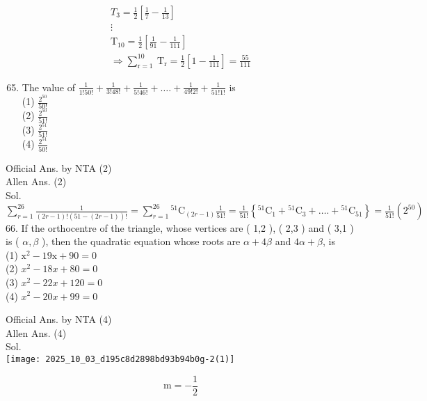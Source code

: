 \documentclass[10pt]{article}
\begin{document}
\[
\begin{gathered}
T_{3}=\frac{1}{2}\left[\frac{1}{7}-\frac{1}{13}\right] \\
\vdots \\
\mathrm{T}_{10}=\frac{1}{2}\left[\frac{1}{91}-\frac{1}{111}\right] \\
\Rightarrow \sum_{\mathrm{r}=1}^{10} \mathrm{~T}_{\mathrm{r}}=\frac{1}{2}\left[1-\frac{1}{111}\right]=\frac{55}{111}
\end{gathered}
\]

\begin{enumerate}
  \setcounter{enumi}{64}
  \item The value of \(\frac{1}{1!50!}+\frac{1}{3!48!}+\frac{1}{5!46!}+\ldots .+\frac{1}{49!2!}+\frac{1}{51!1!}\) is\\
(1) \(\frac{2^{50}}{50!}\)\\
(2) \(\frac{2^{50}}{51!}\)\\
(3) \(\frac{2^{51}}{51!}\)\\
(4) \(\frac{2^{51}}{50!}\)
\end{enumerate}

Official Ans. by NTA (2)\\
Allen Ans. (2)\\
Sol. \(\sum_{r=1}^{26} \frac{1}{(2 r-1)!(51-(2 r-1))!}=\sum_{r=1}^{26}{ }^{51} \mathrm{C}_{(2 r-1)} \frac{1}{51!} =\frac{1}{51!}\left\{{ }^{51} \mathrm{C}_{1}+{ }^{51} \mathrm{C}_{3}+\ldots .+{ }^{51} \mathrm{C}_{51}\right\}=\frac{1}{51!}\left(2^{50}\right)\)\\
66. If the orthocentre of the triangle, whose vertices are ( 1,2 ), ( 2,3 ) and ( 3,1 ) is ( \(\alpha, \beta\) ), then the quadratic equation whose roots are \(\alpha+4 \beta\) and \(4 \alpha+\beta\), is\\
(1) \(\mathrm{x}^{2}-19 \mathrm{x}+90=0\)\\
(2) \(x^{2}-18 x+80=0\)\\
(3) \(x^{2}-22 x+120=0\)\\
(4) \(x^{2}-20 x+99=0\)

Official Ans. by NTA (4)\\
Allen Ans. (4)\\
Sol.\\
\texttt{[image: 2025\_10\_03\_d195c8d2898bd93b94b0g-2(1)]}

\[
\mathrm{m}=-\frac{1}{2}
\]
\end{document}
